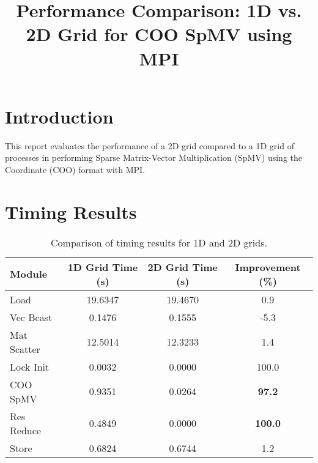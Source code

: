 \documentclass[a4paper,12pt]{article}
\title{Performance Comparison: 1D vs. 2D Grid for COO SpMV using MPI}
\author{}
\date{}
\begin{document}
\maketitle

\section*{Introduction}
This report evaluates the performance of a 2D grid compared to a 1D grid of processes in performing Sparse Matrix-Vector Multiplication (SpMV) using the Coordinate (COO) format with MPI.

\section*{Timing Results}
\begin{table}[h!]
\centering
\begin{tabular}{@{}lccc@{}}
\toprule
\textbf{Module}    & \textbf{1D Grid Time (s)} & \textbf{2D Grid Time (s)} & \textbf{Improvement (\%)} \\ 
\midrule
Load               & 19.6347                  & 19.4670                  & 0.9                      \\
Vec Bcast          & 0.1476                   & 0.1555                   & -5.3                     \\
Mat Scatter        & 12.5014                  & 12.3233                  & 1.4                      \\
Lock Init          & 0.0032                   & 0.0000                   & 100.0                    \\
COO SpMV           & 0.9351                   & 0.0264                   & \textbf{97.2}            \\
Res Reduce         & 0.4849                   & 0.0000                   & \textbf{100.0}           \\
Store              & 0.6824                   & 0.6744                   & 1.2                      \\
\bottomrule
\end{tabular}
\caption{Comparison of timing results for 1D and 2D grids.}
\label{tab:timing-results}
\end{table}
\end{document}
